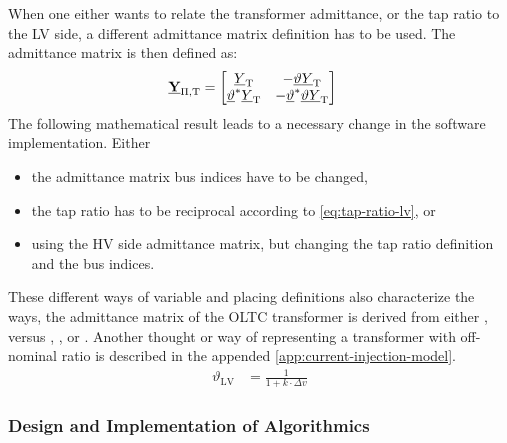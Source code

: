 When one either wants to relate the transformer admittance, or the tap ratio to the \acs{LV} side, a different admittance matrix definition has to be used.
The admittance matrix is then defined as:
\begin{align}
        \underline{\mathrm{\textbf{Y}}}_\mathrm{\Pi,T}&= 
        \begin{bmatrix}
            \underline{Y}_\mathrm{T} & -\underline{\vartheta}\underline{Y}_\mathrm{T} \\
            \underline{\vartheta}^*\underline{Y}_\mathrm{T} & -\underline{\vartheta}^*\underline{\vartheta}\underline{Y}_\mathrm{T}
        \end{bmatrix} \label{eq:admittance-oltc}
    \end{align}
The following mathematical result leads to a necessary change in the software implementation.
Either 
\begin{itemize}
        \item the admittance matrix bus indices have to be changed,
        \item the tap ratio has to be reciprocal according to \autoref{eq:tap-ratio-lv}, or
        \item using the \acs{HV} side admittance matrix, but changing the tap ratio definition and the bus indices.
\end{itemize}
These different ways of variable and placing definitions also characterize the ways, the admittance matrix of the \acs{OLTC} transformer is derived from either \textcite{machowski_2020}, versus \textcite{kundur_2022}, \textcite{milano_2010}, or \textcite{burlakin_2024}.
Another thought or way of representing a transformer with off-nominal ratio is described in the appended \autoref{app:current-injection-model}.
\begin{align}
        \vartheta_\mathrm{LV} &= \frac{1}{1 + k \cdot \Delta v} \label{eq:tap-ratio-lv}
\end{align}

\subsubsection{Design and Implementation of Algorithmics}

